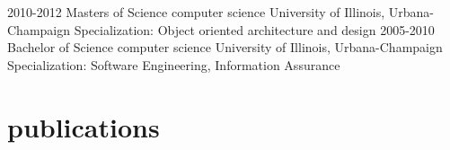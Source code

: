 \documentclass{friggeri-cv} %
\begin{document}
\begin{entrylist}
\entry
{2010-2012}
{Masters of Science {\normalfont computer science}}
{University of Illinois, Urbana-Champaign}
{Specialization: Object oriented architecture and design}
\entry
{2005-2010}
{Bachelor of Science {\normalfont computer science}}
{University of Illinois, Urbana-Champaign}
{Specialization: Software Engineering, Information Assurance}
\end{entrylist}


\section{publications}





\end{document}

